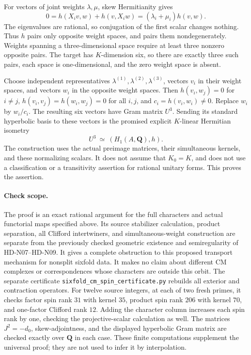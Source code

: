 For vectors of joint weights $\lambda,\mu$, skew
Hermitianity gives
\[
       0=h(X_iv,w)+h(v,X_iw)
                     =(\lambda_i+\mu_i)h(v,w).
\]
The eigenvalues are rational, so conjugation of the
first scalar changes nothing. Thus $h$ pairs only
opposite weight spaces, and pairs them nondegenerately.
Weights spanning a three-dimensional space require
at least three nonzero opposite pairs. The target has
$K$-dimension six, so there are exactly three such
pairs, each space is one-dimensional, and the zero
weight space is absent.

Choose independent representatives
$\lambda^{(1)},\lambda^{(2)},\lambda^{(3)}$,
vectors $v_i$ in their weight spaces, and vectors
$w_i$ in the opposite weight spaces. Then
$h(v_i,w_j)=0$ for $i\ne j$,
$h(v_i,v_j)=h(w_i,w_j)=0$ for all $i,j$, and
$c_i=h(v_i,w_i)\ne0$. Replace $w_i$ by $w_i/c_i$.
The resulting six vectors have Gram matrix $U^3$.
Sending its standard hyperbolic basis to these vectors
is the promised explicit $K$-linear Hermitian isometry
\begin{equation}
                  U^3\ \simeq\ (H_1(A,\mathbf Q),h).
                                                        \tag{N17.13}
\end{equation}
The construction uses the actual preimage matrices,
their simultaneous kernels, and these normalizing
scalars. It does not assume that $K_0=K$, and does
not use a classification or a transitivity assertion
for rational unitary forms. This proves the assertion.

\paragraph{Check scope.}
The proof is an exact rational argument for the full
characters and actual functorial maps specified above.
Its source stabilizer calculation, product separation,
all Clifford intertwiners, and simultaneous-weight
construction are separate from the previously checked
geometric existence and semiregularity of HD-N07--HD-N09.
It gives a complete obstruction to this proposed
transport mechanism for nonsplit sixfold data. It
makes no claim about different CM complexes or
correspondences whose characters are outside this orbit.
The separate certificate
\texttt{sixfold\_\allowbreak cm\_\allowbreak spin\_\allowbreak certificate.py}
rebuilds all exterior and contraction operators. For twelve source
integers, at each of two fresh primes, it checks factor spin rank
$31$ with kernel $35$, product spin rank $206$ with kernel $70$,
and one-factor Clifford rank $12$. Adding the character column
increases each spin rank by one, checking the projective-scalar
calculation as well. The matrices $J^2=-d_0$, skew-adjointness,
and the displayed hyperbolic Gram matrix are checked exactly over
$\mathbf Q$ in each case. These finite computations supplement
the universal proof; they are not used to infer it by interpolation.
